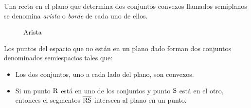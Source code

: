 \clearpage

\begin{definition}
    Una recta en el plano que determina dos conjuntos convexos llamados semiplanos se denomina \textit{arista} o \textit{borde} de cada uno de ellos.

    \begin{figure}[!h]
        \centering
        
        \caption{Arista}
        \label{fig:arista}
    \end{figure}
    
\end{definition}

\begin{postulate}
    Los puntos del espacio que no están en un plano dado forman dos conjuntos denominados semiespacios tales que:

    \begin{itemize}
        \item Los dos conjuntos, uno a cada lado del plano, son convexos.
        \item Si un punto $\rm R$ está en uno de los conjuntos y punto $\rm S$ está en el otro, entonces el segmentos $\overline{\rm RS}$ interseca al plano en un punto.
    \end{itemize}
\end{postulate}
